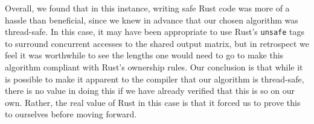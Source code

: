 Overall, we found that in this instance, writing safe Rust code was more of a hassle than beneficial, since we knew in advance that our chosen algorithm was thread-safe. In this case, it may have been appropriate to use Rust's \texttt{unsafe} tags to surround concurrent accesses to the shared output matrix, but in retrospect we feel it was worthwhile to see the lengths one would need to go to make this algorithm compliant with Rust's ownership rules. Our conclusion is that while it is possible to make it apparent to the compiler that our algorithm is thread-safe, there is no value in doing this if we have already verified that this is so on our own. Rather, the real value of Rust in this case is that it forced us to prove this to ourselves before moving forward.